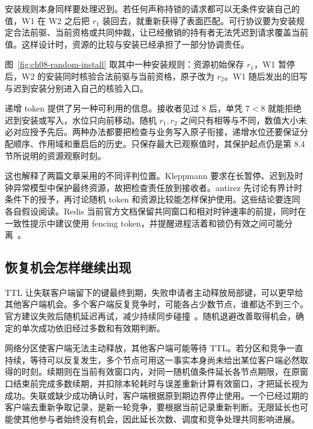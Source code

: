 安装规则本身同样要处理迟到。若任何声称持锁的请求都可以无条件安装自己的值，W1 在 W2 之后把 \(r_1\) 装回去，就重新获得了表面匹配。可行协议要为安装规定合法前驱、当前资格或共同仲裁，让已经撤销的持有者无法凭迟到请求覆盖当前值。这样设计时，资源的比较与安装已经承担了一部分协调责任。

图~\ref{fig:ch08-random-install} 取其中一种安装规则：资源初始保存 \(r_1\)，W1 暂停后，W2 的安装同时核验合法前驱与当前资格，原子改为 \(r_2\)。W1 随后发出的旧写与迟到安装分别进入自己的核验入口。


递增 token 提供了另一种可利用的信息。接收者见过 8 后，单凭 \(7<8\) 就能拒绝迟到安装或写入，水位只向前移动。随机 \(r_1,r_2\) 之间只有相等与不同，数值大小未必对应授予先后。两种办法都要把检查与业务写入原子衔接，递增水位还要保证分配顺序、作用域和重启后的历史。只保存最大已观察值时，其保护起点仍是第 8.4 节所说明的资源观察时刻。

这也解释了两篇文章采用的不同评判位置。Kleppmann 要求在长暂停、迟到及时钟异常模型中保护最终资源，故把检查责任放到接收者。antirez 先讨论有界计时条件下的授予，再讨论随机 token 和资源比较能怎样保护使用。这些结论要连同各自假设阅读。Redis 当前官方文档保留共同窗口和相对时钟速率的前提，同时在一致性提示中建议使用 fencing token，并提醒进程活着和锁仍有效之间可能分离~\cite{redis-redlock}。

\subsection*{恢复机会怎样继续出现}

TTL 让失联客户端留下的键最终到期，失败申请者主动释放局部键，可以更早给其他客户端机会。多个客户端反复竞争时，可能各占少数节点，谁都达不到三个。官方建议失败后随机延迟再试，减少持续同步碰撞~\cite{redis-redlock}。随机退避改善取得机会，确定的单次成功依旧经过多数和有效期判断。

网络分区使客户端无法主动释放，其他客户端可能等待 TTL。若分区和竞争一直持续，等待可以反复发生，多个节点可用这一事实本身尚未给出某位客户端必然取得的时刻。续期则在当前有效窗口内，对同一随机值条件延长各节点期限，在原窗口结束前完成多数续期，并扣除本轮耗时与误差重新计算有效窗口，才把延长视为成功。失联或缺少成功确认时，客户端根据原到期边界停止使用。一个已经过期的客户端去重新争取记录，是新一轮竞争，要根据当前记录重新判断。无限延长也可能使其他参与者始终没有机会，因此延长次数、调度和竞争处理共同影响进展。

